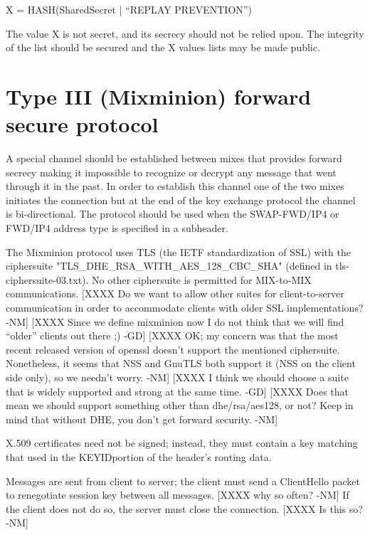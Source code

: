 X = HASH(SharedSecret | ``REPLAY PREVENTION'')

The value X is not secret, and its secrecy should not be relied upon.
The integrity of the list should be secured and the X values lists may
be made public.

\section{Type III (Mixminion) forward secure protocol}

A special channel should be established between mixes that provides
forward secrecy making it impossible to recognize or decrypt any
message that went through it in the past. In order to establish this
channel one of the two mixes initiates the connection but at the end
of the key exchange protocol the channel is bi-directional. The
protocol should be used when the SWAP-FWD/IP4 or FWD/IP4 address type
is specified in a subheader.

The Mixminion protocol uses TLS (the IETF standardization of SSL) with
the ciphersuite "TLS_DHE_RSA_WITH_AES_128_CBC_SHA" (defined in
tls-ciphersuite-03.txt).  No other ciphersuite is permitted for
MIX-to-MIX communications.
[XXXX Do we want to allow other suites for client-to-server
      communication in order to accommodate clients with older SSL
      implementations? -NM]
[XXXX Since we define mixminion now I do not think that we will find
      ``older'' clients out there ;) -GD]
[XXXX OK; my concern was that the most recent released version of
      openssl doesn't support the mentioned ciphersuite.  Nonetheless,
      it seems that NSS and GnuTLS both support it (NSS on the client
      side only), so we needn't worry. -NM]  
[XXXX I think we should choose a suite that is widely supported and
      strong at the same time. -GD]
[XXXX Does that mean we should support something other than
      dhe/rsa/aes128, or not?  Keep in mind that without DHE, you
      don't get forward security. -NM]

X.509 certificates need not be signed; instead, they must contain
a key matching that used in the KEYIDportion of the header's routing
data.  

Messages are sent from client to server; the client must send a
ClientHello packet to renegotiate session key between all
messages. [XXXX why so often? -NM] If the client does not do so, the
server must close the connection.  [XXXX Is this so? -NM]

